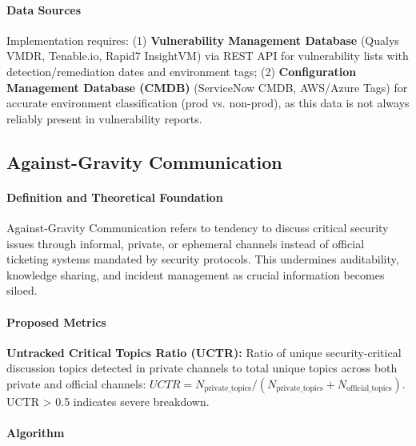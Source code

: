 \documentclass[11pt, a4paper]{article}
\begin{document}
\paragraph{Data Sources}
Implementation requires: (1) \textbf{Vulnerability Management Database} (Qualys VMDR, Tenable.io, Rapid7 InsightVM) via REST API for vulnerability lists with detection/remediation dates and environment tags; (2) \textbf{Configuration Management Database (CMDB)} (ServiceNow CMDB, AWS/Azure Tags) for accurate environment classification (prod vs. non-prod), as this data is not always reliably present in vulnerability reports.

\subsection{Against-Gravity Communication}
\label{subsec:against_gravity_comm}

\paragraph{Definition and Theoretical Foundation}
Against-Gravity Communication refers to tendency to discuss critical security issues through informal, private, or ephemeral channels instead of official ticketing systems mandated by security protocols. This undermines auditability, knowledge sharing, and incident management as crucial information becomes siloed.

\paragraph{Proposed Metrics}
\textbf{Untracked Critical Topics Ratio (UCTR):} Ratio of unique security-critical discussion topics detected in private channels to total unique topics across both private and official channels: $UCTR = N_{\text{private\_topics}} / (N_{\text{private\_topics}} + N_{\text{official\_topics}})$. UCTR > 0.5 indicates severe breakdown.

\paragraph{Algorithm}
\end{document}
